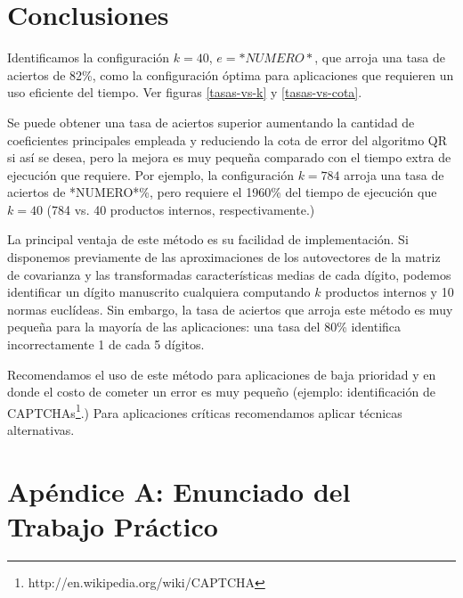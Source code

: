 \documentclass[a4paper,10pt,twoside]{article}
\begin{document}


\section{Conclusiones}

Identificamos la configuración $k = 40$, $e = *NUMERO*$, que arroja una tasa de aciertos de 82\%, como la configuración óptima para aplicaciones que requieren un uso eficiente del tiempo. Ver figuras \ref{tasas-vs-k} y \ref{tasas-vs-cota}.

Se puede obtener una tasa de aciertos superior aumentando la cantidad de coeficientes principales empleada y reduciendo la cota de error del algoritmo QR si así se desea, pero la mejora es muy pequeña comparado con el tiempo extra de ejecución que requiere. Por ejemplo, la configuración $k = 784$ arroja una tasa de aciertos de *NUMERO*\%, pero requiere el 1960\% del tiempo de ejecución que $k = 40$ (784 vs. 40 productos internos, respectivamente.)

La principal ventaja de este método es su facilidad de implementación. Si disponemos previamente de las aproximaciones de los autovectores de la matriz de covarianza y las transformadas características medias de cada dígito, podemos identificar un dígito manuscrito cualquiera computando $k$ productos internos y 10 normas euclídeas. Sin embargo, la tasa de aciertos que arroja este método es muy pequeña para la mayoría de las aplicaciones: una tasa del 80\% identifica incorrectamente 1 de cada 5 dígitos.

Recomendamos el uso de este método para aplicaciones de baja prioridad y en donde el costo de cometer un error es muy pequeño (ejemplo: identificación de CAPTCHAs\footnote{http://en.wikipedia.org/wiki/CAPTCHA}.) Para aplicaciones críticas recomendamos aplicar técnicas alternativas.




\newpage

\section{Apéndice A: Enunciado del Trabajo Práctico}
\end{document}
